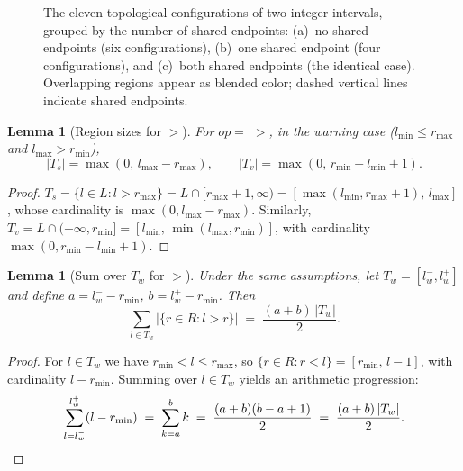 \documentclass[pdflatex,sn-basic]{sn-jnl}%
\theoremstyle{thmstyleone}%
\newtheorem{lemma}[theorem]{Lemma}%
\theoremstyle{thmstyletwo}%
\theoremstyle{thmstylethree}%
\begin{document}
\begin{figure}[t]
\caption{The eleven topological configurations of two integer intervals, grouped by the number of shared endpoints:
(a)~no shared endpoints (six configurations), (b)~one shared endpoint (four configurations), and (c)~both shared endpoints (the identical case).
Overlapping regions appear as blended color;
dashed vertical lines indicate shared endpoints.}
\label{fig:interval-topologies}
\end{figure}

\begin{lemma}[Region sizes for $>$]\label{lem:region-gt}
For $op = ${} $>$, in the warning case ($l_{\min} \leq r_{\max}$ and $l_{\max} > r_{\min}$),
\[
|T_s| = \max(0,\, l_{\max} - r_{\max}), \qquad
|T_v| = \max(0,\, r_{\min} - l_{\min} + 1).
\]
\end{lemma}

\begin{proof}
$T_s = \{l \in L : l > r_{\max}\} = L \cap [r_{\max}+1, \infty) = [\max(l_{\min}, r_{\max}+1),\, l_{\max}]$, whose cardinality is $\max(0, l_{\max} - r_{\max})$. Similarly, $T_v = L \cap (-\infty, r_{\min}] = [l_{\min},\, \min(l_{\max}, r_{\min})]$, with cardinality $\max(0, r_{\min} - l_{\min} + 1)$.
\end{proof}

\begin{lemma}[Sum over $T_w$ for $>$]\label{lem:tw-gt}
Under the same assumptions, let $T_w = [l_w^-, l_w^+]$ and define $a = l_w^- - r_{\min}$, $b = l_w^+ - r_{\min}$. Then
\[
\sum_{l \in T_w} \big|\{r \in R : l > r\}\big| \;=\; \frac{(a + b)\, |T_w|}{2}.
\]
\end{lemma}

\begin{proof}
For $l \in T_w$ we have $r_{\min} < l \leq r_{\max}$, so $\{r \in R : r < l\} = [r_{\min},\, l - 1]$, with cardinality $l - r_{\min}$. Summing over $l \in T_w$ yields an arithmetic progression:
\[
\sum_{l = l_w^-}^{l_w^+} (l - r_{\min}) \;=\; \sum_{k = a}^{b} k \;=\; \frac{(a + b)(b - a + 1)}{2} \;=\; \frac{(a + b)\, |T_w|}{2}. \qedhere
\]
\end{proof}
\end{document}
